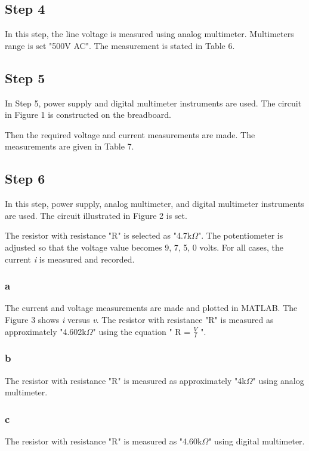 \documentclass[letterpaper,12pt]{article}
\begin{document}
\subsection{Step 4}
In this step, the line voltage is measured using analog multimeter. Multimeters range is set "500V AC". The measurement is stated in Table 6.


\subsection{Step 5}
In Step 5, power supply and digital multimeter instruments are used. The circuit in Figure 1 is constructed on the breadboard. 

Then the required voltage and current measurements are made. The measurements are given in Table 7.


\subsection{Step 6}
In this step, power supply, analog multimeter, and digital multimeter instruments are used. The circuit illustrated in Figure 2 is set. 


The resistor with resistance "R" is selected as "4.7k\(\Omega\)". The potentiometer is adjusted so that the voltage value becomes 9, 7, 5, 0 volts. For all cases, the current \emph{i} is measured and recorded.

\subsubsection{a}
The current and voltage measurements are made and plotted in MATLAB. The Figure 3 shows  \emph{i} versus \emph{v}. The resistor with resistance "R" is measured as approximately "4.602k\(\Omega\)" using the equation " R  = \(\frac{V}{I}\) ".



\subsubsection{b}

The resistor with resistance "R" is measured as approximately "4k\(\Omega\)" using analog multimeter.
\subsubsection{c}

The resistor with resistance "R" is measured as  "4.60k\(\Omega\)" using digital multimeter.
\end{document}

